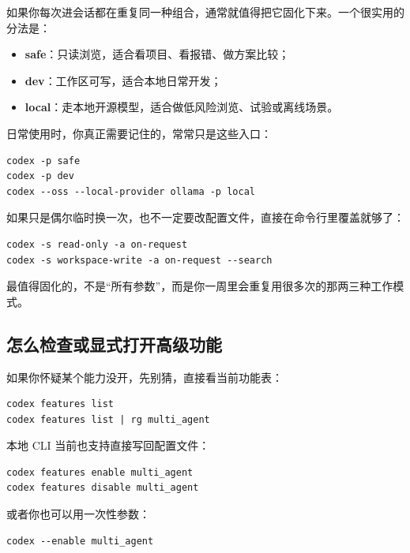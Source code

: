 \documentclass[UTF8,a4paper,12pt]{ctexart}
\begin{document}
如果你每次进会话都在重复同一种组合，通常就值得把它固化下来。一个很实用的分法是：
\begin{itemize}
  \item \textbf{safe}：只读浏览，适合看项目、看报错、做方案比较；
  \item \textbf{dev}：工作区可写，适合本地日常开发；
  \item \textbf{local}：走本地开源模型，适合做低风险浏览、试验或离线场景。
\end{itemize}

日常使用时，你真正需要记住的，常常只是这些入口：

\begin{lstlisting}[style=cli]
codex -p safe
codex -p dev
codex --oss --local-provider ollama -p local
\end{lstlisting}

如果只是偶尔临时换一次，也不一定要改配置文件，直接在命令行里覆盖就够了：

\begin{lstlisting}[style=cli]
codex -s read-only -a on-request
codex -s workspace-write -a on-request --search
\end{lstlisting}

\begin{tipbox}
最值得固化的，不是“所有参数”，而是你一周里会重复用很多次的那两三种工作模式。
\end{tipbox}

\subsection{怎么检查或显式打开高级功能}

如果你怀疑某个能力没开，先别猜，直接看当前功能表：

\begin{lstlisting}[style=cli]
codex features list
codex features list | rg multi_agent
\end{lstlisting}

本地 CLI 当前也支持直接写回配置文件：

\begin{lstlisting}[style=cli]
codex features enable multi_agent
codex features disable multi_agent
\end{lstlisting}

或者你也可以用一次性参数：

\begin{lstlisting}[style=cli]
codex --enable multi_agent
\end{lstlisting}
\end{document}
